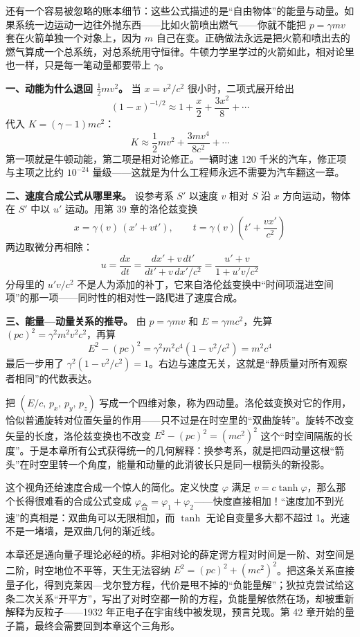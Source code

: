 \begin{mainline}
还有一个容易被忽略的账本细节：这些公式描述的是“自由物体”的能量与动量。如果系统一边运动一边往外抛东西——比如火箭喷出燃气——你就不能把 \(p=\gamma mv\) 套在火箭单独一个对象上，因为 \(m\) 自己在变。正确做法永远是把火箭和喷出去的燃气算成一个总系统，对总系统用守恒律。牛顿力学里学过的火箭如此，相对论里也一样，只是每一笔动量都要带上 \(\gamma\)。
\end{mainline}

\begin{mathbridge}
\textbf{一、动能为什么退回 \(\tfrac12 mv^{2}\)。} 当 \(x=v^{2}/c^{2}\) 很小时，二项式展开给出
\[
(1-x)^{-1/2}\approx 1+\frac{x}{2}+\frac{3x^{2}}{8}+\cdots
\]
代入 \(K=(\gamma-1)mc^{2}\)：
\[
K\approx \frac12 mv^{2}+\frac{3mv^{4}}{8c^{2}}+\cdots
\]
第一项就是牛顿动能，第二项是相对论修正。一辆时速 120 千米的汽车，修正项与主项之比约 \(10^{-24}\) 量级——这就是为什么工程师永远不需要为汽车翻这一章。

\textbf{二、速度合成公式从哪里来。} 设参考系 \(S'\) 以速度 \(v\) 相对 \(S\) 沿 \(x\) 方向运动，物体在 \(S'\) 中以 \(u'\) 运动。用第 39 章的洛伦兹变换
\[
x=\gamma(v)\,(x'+vt'),\qquad t=\gamma(v)\left(t'+\frac{vx'}{c^{2}}\right)
\]
两边取微分再相除：
\[
u=\frac{dx}{dt}=\frac{dx'+v\,dt'}{dt'+v\,dx'/c^{2}}=\frac{u'+v}{1+u'v/c^{2}}
\]
分母里的 \(u'v/c^{2}\) 不是人为添加的补丁，它来自洛伦兹变换中“时间项混进空间项”的那一项——同时性的相对性一路爬进了速度合成。

\textbf{三、能量—动量关系的推导。} 由 \(p=\gamma mv\) 和 \(E=\gamma mc^{2}\)，先算 \((pc)^{2}=\gamma^{2}m^{2}v^{2}c^{2}\)，再算
\[
E^{2}-(pc)^{2}=\gamma^{2}m^{2}c^{4}(1-v^{2}/c^{2})=m^{2}c^{4}
\]
最后一步用了 \(\gamma^{2}(1-v^{2}/c^{2})=1\)。右边与速度无关，这就是“静质量对所有观察者相同”的代数表达。
\end{mathbridge}

\begin{challenge}
把 \((E/c,\,p_x,\,p_y,\,p_z)\) 写成一个四维对象，称为四动量。洛伦兹变换对它的作用，恰似普通旋转对位置矢量的作用——只不过是在时空里的“双曲旋转”。旋转不改变矢量的长度，洛伦兹变换也不改变 \(E^{2}-(pc)^{2}=(mc^{2})^{2}\) 这个“时空间隔版的长度”。于是本章所有公式获得统一的几何解释：换参考系，就是把四动量这根“箭头”在时空里转一个角度，能量和动量的此消彼长只是同一根箭头的新投影。

这个视角还给速度合成一个惊人的简化。定义快度 \(\varphi\) 满足 \(v=c\tanh\varphi\)，那么那个长得很难看的合成公式变成 \(\varphi_{\text{合}}=\varphi_1+\varphi_2\)——快度直接相加！“速度加不到光速”的真相是：双曲角可以无限相加，而 \(\tanh\) 无论自变量多大都不超过 1。光速不是一堵墙，是双曲几何的渐近线。

本章还是通向量子理论必经的桥。非相对论的薛定谔方程对时间是一阶、对空间是二阶，时空地位不平等，天生无法容纳 \(E^{2}=(pc)^{2}+(mc^{2})^{2}\)。把这条关系直接量子化，得到克莱因—戈尔登方程，代价是甩不掉的“负能量解”；狄拉克尝试给这条二次关系“开平方”，写出了对时空都一阶的方程，负能量解依然在场，却被重新解释为反粒子——1932 年正电子在宇宙线中被发现，预言兑现。第 42 章开始的量子篇，最终会需要回到本章这个三角形。
\end{challenge}

